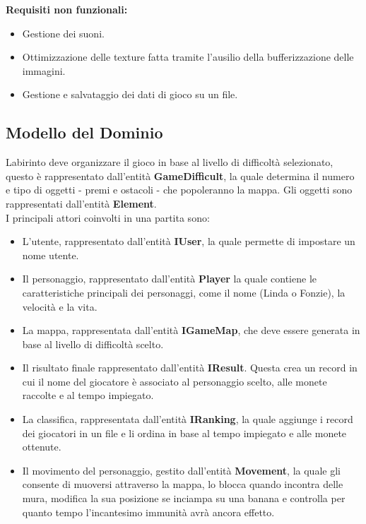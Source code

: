 \documentclass[12pt, letterpaper]{article}
\begin{document}
        \textbf{Requisiti non funzionali:}
            \begin{itemize}
                \item Gestione dei suoni.
                \item Ottimizzazione delle texture fatta tramite l'ausilio della bufferizzazione delle immagini.
                \item Gestione e salvataggio dei dati di gioco su un file.
            \end{itemize}
    \subsection{Modello del Dominio}
        Labirinto deve organizzare il gioco in base al livello di difficoltà selezionato, questo è rappresentato dall'entità \textbf{GameDifficult}, la quale determina il numero e tipo di oggetti  -  premi e ostacoli - che popoleranno la mappa. Gli oggetti sono rappresentati dall'entità \textbf{Element}.\\
        I principali attori coinvolti in una partita sono:
        \begin{itemize}
            \item  L'utente, rappresentato dall’entità \textbf{IUser}, la quale permette di impostare un nome utente.
            \item Il personaggio, rappresentato dall'entità \textbf{Player} la quale contiene le caratteristiche principali dei personaggi, come il nome (Linda o Fonzie), la velocità e la vita.
            \item La mappa, rappresentata dall’entità \textbf{IGameMap}, che deve essere generata in base al livello di difficoltà scelto. 
            \item  Il risultato finale rappresentato dall'entità \textbf{IResult}. Questa crea un record in cui il nome del giocatore è associato al personaggio scelto, alle monete raccolte e al tempo impiegato.
            \item La classifica, rappresentata dall'entità \textbf{IRanking}, la quale aggiunge i record dei giocatori in un file e li ordina in base al tempo impiegato e alle monete ottenute.
            \item Il movimento del personaggio, gestito dall'entità \textbf{Movement}, la quale gli consente di muoversi attraverso la mappa, lo blocca quando incontra delle mura, modifica la sua posizione se inciampa su una banana e controlla per quanto tempo l'incantesimo immunità avrà ancora effetto.
        \end{itemize}
\end{document}
